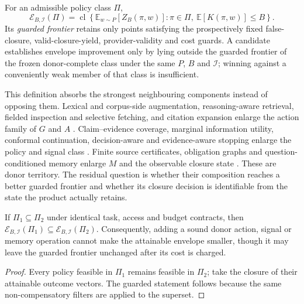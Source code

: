 \begin{definition}
\label{def:acquisition-authority-envelope}
For an admissible policy class $\Pi$,
\[
 \mathcal E_{B,\mathcal I}(\Pi)
 =\operatorname{cl}\left\{
     \mathbb E_{w\sim P}[Z_B(\pi,w)] :
     \pi\in\Pi,\ \mathbb E[K(\pi,w)]\le B
   \right\}.
\]
Its \emph{guarded frontier} retains only points satisfying the prospectively
fixed false-closure, valid-closure-yield, provider-validity and cost guards.
A candidate establishes envelope improvement only by lying outside the guarded
frontier of the frozen donor-complete class under the same $P$, $B$ and
$\mathcal I$; winning against a conveniently weak member of that class is
insufficient.
\end{definition}

This definition absorbs the strongest neighbouring components instead of
opposing them.  Lexical and corpus-side augmentation, reasoning-aware retrieval,
fielded inspection and selective fetching, and citation expansion enlarge the
action family of $G$ and $A$ \cite{sage2026,agentir2026,sieve2026,rethinkinglitsearch2026}.
Claim--evidence coverage, marginal information utility, conformal continuation,
decision-aware and evidence-aware stopping enlarge the policy and signal class
\cite{halt2026,deepcontrol2026,micp2026,decisionstop2026,donotstopearly2026,confidencebasedstop2026}.
Finite source certificates, obligation graphs and question-conditioned memory
enlarge $M$ and the observable closure state
\cite{knowplan2026,icore2026,memchain2026,scienceintent2026}.  These are donor
territory.  The residual question is whether their composition reaches a better
guarded frontier and whether its closure decision is identifiable from the
state the product actually retains.

\begin{proposition}
\label{prop:donor-monotonicity}
If $\Pi_1\subseteq\Pi_2$ under identical task, access and budget contracts, then
$\mathcal E_{B,\mathcal I}(\Pi_1)\subseteq
\mathcal E_{B,\mathcal I}(\Pi_2)$.  Consequently, adding a sound donor action,
signal or memory operation cannot make the attainable envelope smaller, though
it may leave the guarded frontier unchanged after its cost is charged.
\end{proposition}

\begin{proof}
Every policy feasible in $\Pi_1$ remains feasible in $\Pi_2$; take the closure
of their attainable outcome vectors.  The guarded statement follows because
the same non-compensatory filters are applied to the superset.
\end{proof}

